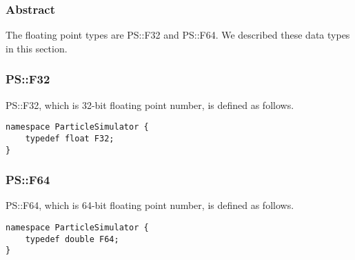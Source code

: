 \subsubsection{Abstract}

The floating point types are PS::F32 and PS::F64. We described
these data types in this section.

\subsubsection{PS::F32}

PS::F32, which is 32-bit floating point number, is defined as follows.
\begin{lstlisting}[caption=F32]
namespace ParticleSimulator {
    typedef float F32;
}
\end{lstlisting}

\subsubsection{PS::F64}

PS::F64, which is 64-bit floating point number, is defined as follows.
\begin{lstlisting}[caption=F64]
namespace ParticleSimulator {
    typedef double F64;
}
\end{lstlisting}
